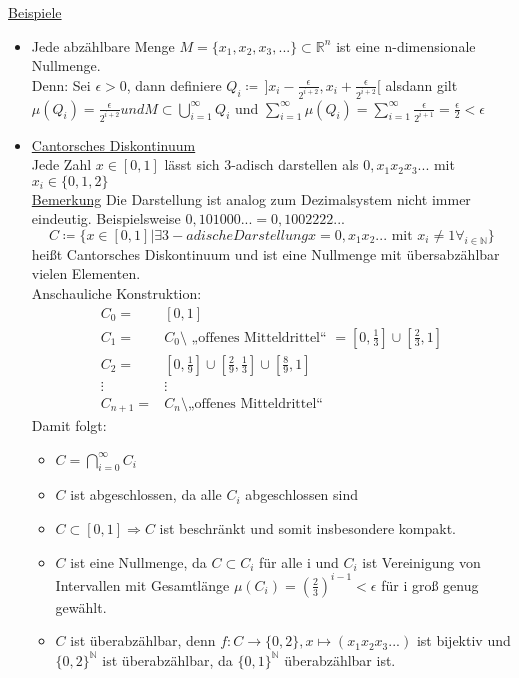 \underline{Beispiele}
\begin{itemize}
	\item Jede abzählbare Menge $M = \{x_1, x_2, x_3, ...\} \subset \mathbb{R}^n$ ist eine n-dimensionale Nullmenge.\\
	Denn: Sei $\epsilon > 0$, dann definiere $Q_i \coloneqq\, ]x_i - \frac{\epsilon}{2^{i+2}}, x_i + \frac{\epsilon}{2^{i+2}}[$ alsdann gilt $\mu(Q_i) = \frac{\epsilon}{2^{i+2}} und M \subset \bigcup_{i=1}^{\infty} Q_i$ und $\sum_{i=1}^{\infty} \mu(Q_i) = \sum_{i=1}^{\infty} \frac{\epsilon}{2^{i+1}} = \frac{\epsilon}{2} < \epsilon$
	\item \underline{Cantorsches Diskontinuum}\\
	Jede Zahl $x \in [0,1]$ lässt sich 3-adisch darstellen als $0,x_1 x_2 x_3 ...$ mit $x_i \in \{0,1,2\}$\\
	\underline{Bemerkung}
	Die Darstellung ist analog zum Dezimalsystem nicht immer eindeutig. Beispielsweise $0,101000... = 0,1002222...$
	\[C\coloneqq \{x \in [0,1] | \exists 3-adische Darstellung x = 0,x_1x_2... \text{ mit } x_i \neq 1 \forall_{i \in \mathbb{N}}\}\] heißt Cantorsches Diskontinuum und ist eine Nullmenge mit übersabzählbar vielen Elementen.\\
	Anschauliche Konstruktion:
\begin{equation*}
	\begin{matrix}
		C_0 = & [0,1]\\
		C_1 = & C_0 \setminus \text{ „offenes Mitteldrittel“ } = [0,\frac{1}{3}] \cup [\frac{2}{3}, 1]\\
		C_2 = & [0,\frac{1}{9}] \cup [\frac{2}{9}, \frac{1}{3}] \cup [\frac{8}{9}, 1]\\
		\vdots & \vdots\\
		C_{n+1} = & C_n \setminus \text{„offenes Mitteldrittel“}
	\end{matrix}
\end{equation*}
Damit folgt:
\begin{itemize}
	\item $C = \bigcap_{i=0}^{\infty} C_i$
	\item $C$ ist abgeschlossen, da alle $C_i$ abgeschlossen sind
	\item $C \subset [0,1] \Rightarrow C $ ist beschränkt und somit insbesondere kompakt.
	\item $C$ ist eine Nullmenge, da $C \subset C_i$ für alle i und $C_i$ ist Vereinigung von Intervallen mit Gesamtlänge $\mu(C_i) = (\frac{2}{3})^{i-1} < \epsilon$ für i groß genug gewählt.
	\item $C$ ist überabzählbar, denn $f\colon C\to \{0,2\}, x\mapsto (x_1 x_2 x_3 ...)$ ist bijektiv und $\{0,2\}^{\mathbb{N}}$ ist überabzählbar, da $\{0,1\}^{\mathbb{N}}$ überabzählbar ist.
\end{itemize}
\end{itemize}

